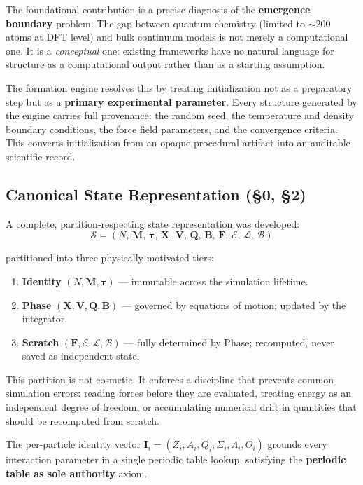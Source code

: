 \documentclass[11pt]{article}
\newcommand{\boldI}{\mathbf{I}}
\begin{document}
The foundational contribution is a precise diagnosis of the
\textbf{emergence boundary} problem.  The gap between quantum
chemistry (limited to $\sim$200 atoms at DFT level) and bulk
continuum models is not merely a computational one.  It is a
\textit{conceptual} one: existing frameworks have no natural
language for structure as a computational output rather than
as a starting assumption.

The formation engine resolves this by treating initialization
not as a preparatory step but as a \textbf{primary experimental
parameter}.  Every structure generated by the engine carries
full provenance: the random seed, the temperature and density
boundary conditions, the force field parameters, and the
convergence criteria.  This converts initialization from an
opaque procedural artifact into an auditable scientific record.

\subsection{Canonical State Representation (\S0, \S2)}

A complete, partition-respecting state representation was
developed:
\[
\mathcal{S} = (N,\,\mathbf{M},\,\boldsymbol{\tau},\,\mathbf{X},\,
\mathbf{V},\,\mathbf{Q},\,\mathbf{B},\,\mathbf{F},\,\mathcal{E},\,
\mathcal{L},\,\mathcal{B})
\]

partitioned into three physically motivated tiers:
\begin{enumerate}
\item \textbf{Identity} $(N, \mathbf{M}, \boldsymbol{\tau})$ ---
      immutable across the simulation lifetime.
\item \textbf{Phase} $(\mathbf{X}, \mathbf{V}, \mathbf{Q}, \mathbf{B})$
      --- governed by equations of motion; updated by the integrator.
\item \textbf{Scratch} $(\mathbf{F}, \mathcal{E}, \mathcal{L}, \mathcal{B})$
      --- fully determined by Phase; recomputed, never saved as
      independent state.
\end{enumerate}

This partition is not cosmetic.  It enforces a discipline that prevents
common simulation errors: reading forces before they are evaluated,
treating energy as an independent degree of freedom, or accumulating
numerical drift in quantities that should be recomputed from scratch.

The per-particle identity vector
$\boldI_i = (Z_i, A_i, Q_i, \Sigma_i, \Lambda_i, \Theta_i)$
grounds every interaction parameter in a single periodic table
lookup, satisfying the \textbf{periodic table as sole authority}
axiom.
\end{document}
